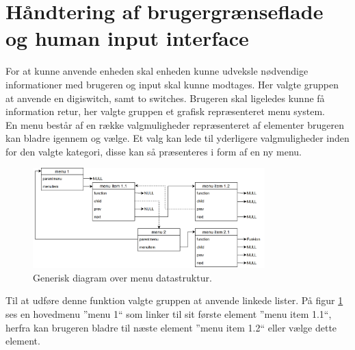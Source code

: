 \section{Håndtering af brugergrænseflade og human input interface}
\label{sec:HID}
For at kunne anvende enheden skal enheden kunne udveksle nødvendige informationer med brugeren og input skal kunne modtages.
Her valgte gruppen at anvende en digiswitch, samt to switches.
Brugeren skal ligeledes kunne få information retur, her valgte gruppen et grafisk repræsenteret menu system.
\\
En menu består af en række valgmuligheder repræsenteret af elementer brugeren kan bladre igennem og vælge.
Et valg kan lede til yderligere valgmuligheder inden for den valgte kategori, disse kan så præsenteres i form af en ny menu.
\begin{figure}[!ht]
	\centering 
	\includegraphics[width=0.8\textwidth]{billeder/menuesdiagram.png} 
	\caption{Generisk diagram over menu datastruktur. } 
	\label{fig:menuesdiagram} 
\end{figure}
Til at udføre denne funktion valgte gruppen at anvende linkede lister.\newline
På figur \ref{fig:menuesdiagram} ses en hovedmenu ''menu 1`` som linker til sit første element ''menu item 1.1``, herfra kan brugeren bladre til næste element ''menu item 1.2`` eller vælge dette element.
